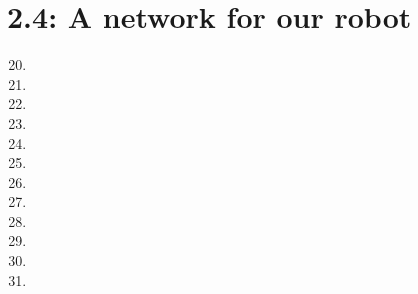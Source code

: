 \documentclass[a4paper,10pt,fleqn]{article}
\begin{document}
\section*{2.4: A network for our robot}
\begin{enumerate}[1.]
	\setcounter{enumi}{19}
    \item

    \item

    \item

    \item

    \item

    \item

    \item

    \item

    \item

    \item

	\item

    \item


\end{enumerate}
\end{document}
